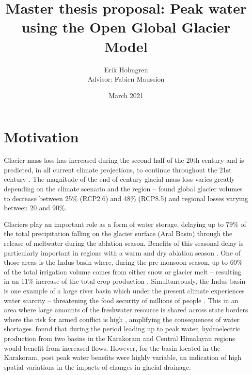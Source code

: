 \documentclass[12pt, a4paper]{article}
\author{Erik Holmgren \\ Advisor: Fabien Maussion}
\title{Master thesis proposal: Peak water using the Open Global Glacier Model}
\date{March 2021}
\begin{document}
\maketitle
\noindent
\section{Motivation}
Glacier mass loss has increased during the second half of the 20th century
\parencite{vaughanObservationsCryosphere2013} and is predicted, in all current
climate projections, to continue throughout the 21st century
\parencite{ipccClimateChange20142014}. The magnitude of the end of century
glacial mass loss varies greatly depending on the climate scenario and the
region -- \textcite{hussNewModelGlobal2015} found global glacier volumes to
decrease between 25\% (RCP2.6) and 48\% (RCP8.5) and regional losses varying
between 20 and 90\%.



Glaciers play an important role as a form of water storage, delaying up to 79\%
of the total precipitation falling on the glacier surface (Aral Basin) through
the release of meltwater during the ablation season. Benefits of this seasonal
delay is particularly important in regions with a warm and dry ablation season
\parencite{kaserContributionPotentialGlaciers2010}. One of those areas is the
Indus basin where, during the pre-monsoon season, up to 60\% of the total
irrigation volume comes from either snow or glacier melt -- resulting in an 11\%
increase of the total crop production
\parencite{biemansImportanceSnowGlacier2019}. Simultaneously, the Indus basin is
one example of a large river basin which under the present climate experiences
water scarcity -- threatening the food security of millions of people
\parencite{kummuClimatedrivenInterannualVariability2014}. This in an area where
large amounts of the freshwater resource is shared across state borders where
the risk for armed conflict is high
\parencite{schleussnerArmedconflictRisksEnhanced2016,
pritchardAsiaShrinkingGlaciers2019}, amplifying the consequences of water
shortages. \textcite{mishraDifferentialImpactClimate2020} found that during the
period leading up to peak water, hydroelectric production from two basins in the
Karakoram and Central Himalayan regions would benefit from increased flows.
However, for the basin located in the Karakoram, post peak water benefits were
highly variable, an indication of high spatial variations in the impacts of
changes in glacial drainage.
\end{document}
